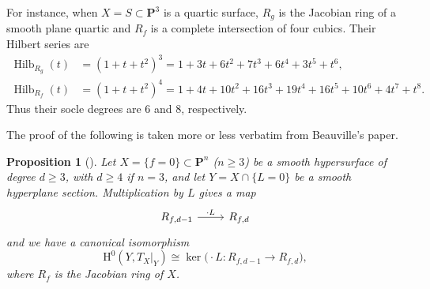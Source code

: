 \documentclass[a4paper,12pt,twoside,reqno]{amsart}
\numberwithin{equation}{section}
\theoremstyle{plain}
\newtheorem{proposition}[theorem]{Proposition}
\theoremstyle{definition}
\newcommand{\PP}{\mathbf{P}}
\newcommand{\HH}{\mathrm{H}}
\theoremstyle{plain}
\theoremstyle{definition}
\begin{document}
For instance, when $X=S\subset\PP^3$ is a quartic surface, $R_g$ is the Jacobian ring of a smooth plane quartic and $R_f$ is a complete intersection of four cubics. Their Hilbert series are
\begin{align*}
\operatorname{Hilb}_{R_g}(t)
&=(1+t+t^2)^3
=1+3t+6t^2+7t^3+6t^4+3t^5+t^6,\\
\operatorname{Hilb}_{R_f}(t)
&=(1+t+t^2)^4
=1+4t+10t^2+16t^3+19t^4+16t^5+10t^6+4t^7+t^8.
\end{align*}
Thus their socle degrees are $6$ and $8$, respectively.


The proof of the following is taken more or less verbatim from Beauville's paper.

\begin{proposition}[{\cite[Proposition~2]{BE}}]\label{prop:beauville}
Let $X=\{f=0\}\subset\PP^n$ ($n\ge3$) be a smooth hypersurface of degree $d\ge3$, with $d\ge4$ if $n=3$, and let $Y=X\cap\{L=0\}$ be a smooth hyperplane section. Multiplication by $L$ gives a map
\[
\begin{tikzcd}
R_{f,d-1} \arrow[r, "\cdot L"] & R_{f,d}
\end{tikzcd}
\]
and we have a canonical isomorphism
\[
\HH^0(Y,T_X|_Y)
\cong\ker\bigl(\cdot L\colon R_{f,d-1}\to R_{f,d}\bigr),
\]
where $R_f$ is the Jacobian ring of $X$.
\end{proposition}
\end{document}
